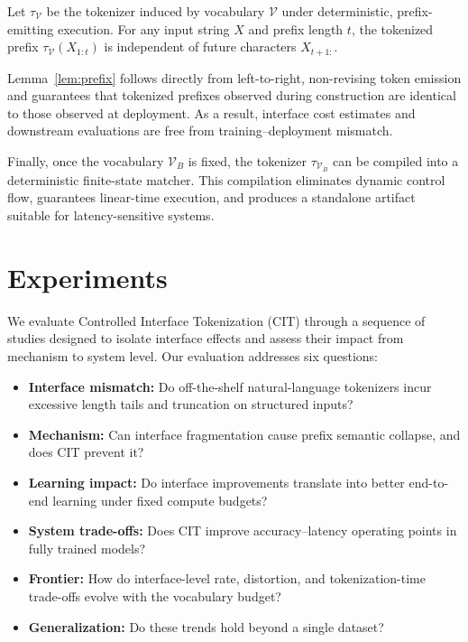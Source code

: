 \begin{lemma}
\label{lem:prefix}
Let $\tau_{\mathcal{V}}$ be the tokenizer induced by vocabulary $\mathcal{V}$ under deterministic, prefix-emitting execution.
For any input string $X$ and prefix length $t$, the tokenized prefix $\tau_{\mathcal{V}}(X_{1:t})$ is independent of future characters $X_{t+1:}$.
\end{lemma}

Lemma~\ref{lem:prefix} follows directly from left-to-right, non-revising token emission and guarantees that tokenized prefixes observed during construction are identical to those observed at deployment.
As a result, interface cost estimates and downstream evaluations are free from training--deployment mismatch.

Finally, once the vocabulary $\mathcal{V}_B$ is fixed, the tokenizer $\tau_{\mathcal{V}_B}$ can be compiled into a deterministic finite-state matcher.
This compilation eliminates dynamic control flow, guarantees linear-time execution, and produces a standalone artifact suitable for latency-sensitive systems.

\section{Experiments}
\label{sec:experiments}

We evaluate Controlled Interface Tokenization (CIT) through a sequence of studies designed to isolate interface effects and assess their impact from mechanism to system level.
Our evaluation addresses six questions:

\begin{itemize}
\item \textbf{Interface mismatch:} Do off-the-shelf natural-language tokenizers incur excessive length tails and truncation on structured inputs?
\item \textbf{Mechanism:} Can interface fragmentation cause prefix semantic collapse, and does CIT prevent it?
\item \textbf{Learning impact:} Do interface improvements translate into better end-to-end learning under fixed compute budgets?
\item \textbf{System trade-offs:} Does CIT improve accuracy--latency operating points in fully trained models?
\item \textbf{Frontier:} How do interface-level rate, distortion, and tokenization-time trade-offs evolve with the vocabulary budget?
\item \textbf{Generalization:} Do these trends hold beyond a single dataset?
\end{itemize}

